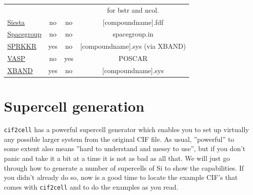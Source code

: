 \documentclass[11pt]{article}
\newcommand{\ciftocell}{\texttt{cif2cell}}
\begin{document}
\begin{table}[p]
\begin{center}
\begin{tabular}{l|c|c|c}
 &  &  & for bstr and ncol. \\
\href{http://www.icmab.es/dmmis/leem/siesta/}{Siesta} & no & no & [compoundname].fdf\\
\href{http://elk.sourceforge.net}{Spacegroup} & no & no & spacegroup.in\\
\href{http://ebert.cup.uni-muenchen.de/sprkkr}{SPRKKR} & yes & no & [compoundname].sys (via XBAND) \\
\href{http://www.vasp.at/}{VASP} & no  & yes & POSCAR \\
\href{http://ebert.cup.uni-muenchen.de/sprkkr}{XBAND} & yes & no & [compoundname].sys\\
\end{tabular}
\end{center}
\label{esptable}
\end{table}%

\section{Supercell generation}
\ciftocell{} has a powerful supercell generator which enables you to set up virtually any possible larger system from the original CIF file. As usual, ''powerful'' to some extent also means ''hard to understand and messy to use'', but if you don't panic and take it a bit at a time it is not as bad as all that. We will just go through how to generate a number of supercells of Si to show the capabilities. If you didn't already do so, now is a good time to locate the example CIF's that comes with \ciftocell{} and to do the examples as you read.
\end{document}
